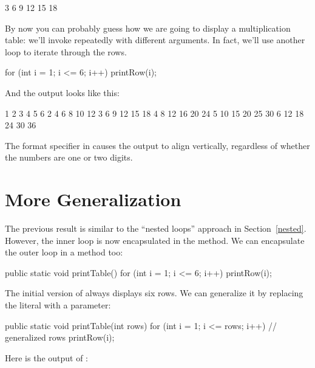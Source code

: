 \begin{stdout}
   3   6   9  12  15  18
\end{stdout}

%

By now you can probably guess how we are going to display a multiplication table: we'll invoke  repeatedly with different arguments.
In fact, we'll use another loop to iterate through the rows.

\begin{code}
for (int i = 1; i <= 6; i++) {
    printRow(i);
}
\end{code}

And the output looks like this:

\begin{stdout}
   1   2   3   4   5   6
   2   4   6   8  10  12
   3   6   9  12  15  18
   4   8  12  16  20  24
   5  10  15  20  25  30
   6  12  18  24  30  36
\end{stdout}

The format specifier  in  causes the output to align vertically, regardless of whether the numbers are one or two digits.


\section{More Generalization}

The previous result is similar to the ``nested loops'' approach in Section~\ref{nested}.
However, the inner loop is now encapsulated in the  method.
We can encapsulate the outer loop in a method too:

\begin{code}
public static void printTable() {
    for (int i = 1; i <= 6; i++) {
        printRow(i);
    }
}
\end{code}

The initial version of  always displays six rows.
We can generalize it by replacing the literal  with a parameter:

\begin{code}
public static void printTable(int rows) {
    for (int i = 1; i <= rows; i++) {     // generalized rows
        printRow(i);
    }
}
\end{code}

Here is the output of :

